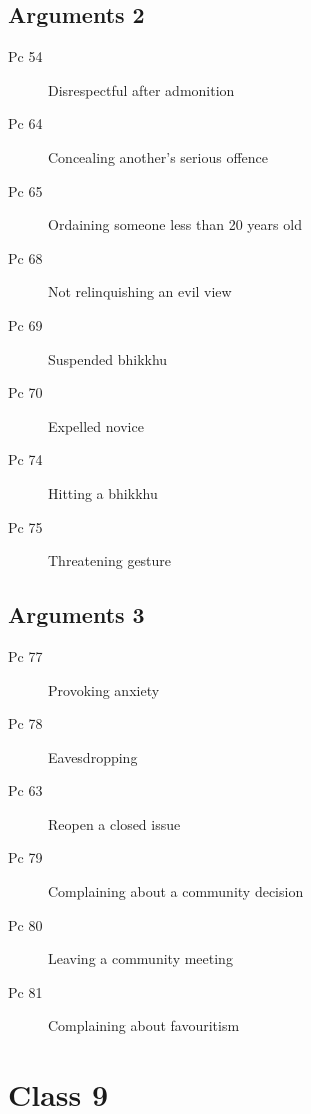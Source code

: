 \documentclass[11pt,oneside]{memoir}
\begin{document}
\begin{multicols}{2}

\section{Arguments 2}

\begin{description}
\item[Pc 54] Disrespectful after admonition
\item[Pc 64] Concealing another's serious offence
\item[Pc 65 \orig] Ordaining someone less than 20 years old%
\item[Pc 68] Not relinquishing an evil view
\item[Pc 69] Suspended bhikkhu
\item[Pc 70] Expelled novice
\item[Pc 74] Hitting a bhikkhu
\item[Pc 75] Threatening gesture
\end{description}

\columnbreak

\section{Arguments 3}

\begin{description}
\item[Pc 77] Provoking anxiety
\item[Pc 78 \orig] Eavesdropping%
\item[Pc 63] Reopen a closed issue
\item[Pc 79 \orig] Complaining about a community decision%
\item[Pc 80 \orig] Leaving a community meeting%
\item[Pc 81] Complaining about favouritism
\end{description}

\end{multicols}

\chapter{Class 9}
\end{document}
